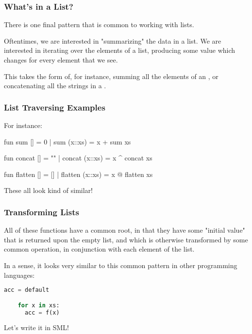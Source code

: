 \documentclass[aspectratio=169, handout]{beamer}
\begin{document}
\begin{frame}[fragile]
  \frametitle{What's in a List?}

  There is one final pattern that is common to working with lists.

  \pause
  \vspace{\fill}

  Oftentimes, we are interested in "summarizing" the data in a list. We are
  interested in iterating over the elements of a list, producing some value which
  changes for every element that we see.

  \pause
  \vspace{\fill}

  This takes the form of, for instance, summing all the elements of an ,
  or concatenating all the strings in a .
\end{frame}

\begin{frame}[fragile]
  \frametitle{List Traversing Examples}

  For instance:

  \pause
  \begin{codeblock}
    fun sum [] = 0
      | sum (x::xs) = x + sum xs

    fun concat [] = ""
      | concat (x::xs) = x ^ concat xs

    fun flatten [] = []
      | flatten (x::xs) = x @ flatten xs
  \end{codeblock}

  \pause
  \vspace{\fill}

  These all look kind of similar!
\end{frame}

\begin{frame}[fragile]
  \frametitle{Transforming Lists}

  All of these functions have a common root, in that they have some "initial value"
  that is returned upon the empty list, and which is otherwise transformed by some
  common operation, in conjunction with each element of the list.

  \pause
  \vspace{\fill}

  In a sense, it looks very similar to this common pattern in other programming
  languages:

  \begin{lstlisting}[language=Python]
    acc = default

    for x in xs:
      acc = f(x)
  \end{lstlisting}

  \pause
  \vspace{\fill}

  Let's write it in SML!
\end{frame}
\end{document}

